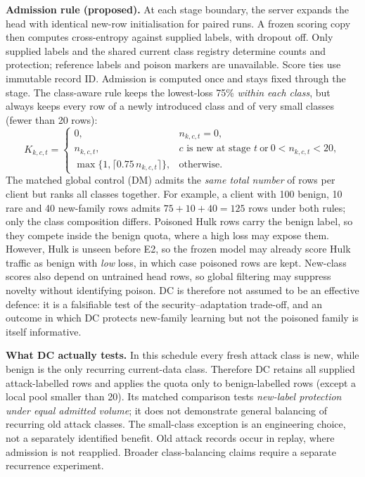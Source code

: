 \documentclass[10pt,a4paper]{article}
\begin{document}
\textbf{Admission rule (proposed).} At each stage boundary, the server expands the head with identical new-row initialisation for paired runs. A frozen scoring copy then computes cross-entropy against supplied labels, with dropout off. Only supplied labels and the shared current class registry determine counts and protection; reference labels and poison markers are unavailable. Score ties use immutable record ID. Admission is computed once and stays fixed through the stage. The class-aware rule keeps the lowest-loss 75\% \emph{within each class}, but always keeps every row of a newly introduced class and of very small classes (fewer than 20 rows):
\begin{equation}
K_{k,c,t}=\begin{cases}
0,&n_{k,c,t}=0,\\
n_{k,c,t},&c\text{ is new at stage }t\ \text{or}\ 0<n_{k,c,t}<20,\\
\max\{1,\lceil 0.75\,n_{k,c,t}\rceil\},&\text{otherwise.}
\end{cases}
\label{eq:quota}
\end{equation}
The matched global control (DM) admits the \emph{same total number} of rows per client but ranks all classes together. For example, a client with 100 benign, 10 rare and 40 new-family rows admits $75+10+40=125$ rows under both rules; only the class composition differs. Poisoned Hulk rows carry the benign label, so they compete inside the benign quota, where a high loss may expose them. However, Hulk is unseen before E2, so the frozen model may already score Hulk traffic as benign with \emph{low} loss, in which case poisoned rows are kept. New-class scores also depend on untrained head rows, so global filtering may suppress novelty without identifying poison. DC is therefore not assumed to be an effective defence: it is a falsifiable test of the security--adaptation trade-off, and an outcome in which DC protects new-family learning but not the poisoned family is itself informative.

\textbf{What DC actually tests.} In this schedule every fresh attack class is new, while benign is the only recurring current-data class. Therefore DC retains all supplied attack-labelled rows and applies the quota only to benign-labelled rows (except a local pool smaller than 20). Its matched comparison tests \emph{new-label protection under equal admitted volume}; it does not demonstrate general balancing of recurring old attack classes. The small-class exception is an engineering choice, not a separately identified benefit. Old attack records occur in replay, where admission is not reapplied. Broader class-balancing claims require a separate recurrence experiment.
\end{document}
